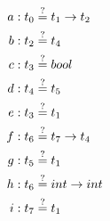 \begin{align*}
  a &: t_0 \stackrel{?}{=} t_1 \to t_2 \\
  b &: t_2 \stackrel{?}{=} t_4 \\
  c &: t_3 \stackrel{?}{=} bool \\
  d &: t_4 \stackrel{?}{=} t_5 \\
  e &: t_3 \stackrel{?}{=} t_1 \\
  f &: t_6 \stackrel{?}{=} t_7 \to t_4 \\
  g &: t_5 \stackrel{?}{=} t_1 \\
  h &: t_6 \stackrel{?}{=} int \to int \\
  i &: t_7 \stackrel{?}{=} t_1
\end{align*}